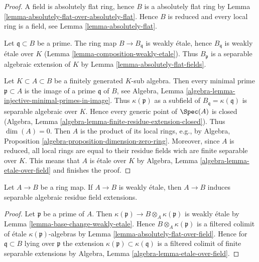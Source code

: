 \begin{proof}
A field is absolutely flat ring, hence $B$ is a absolutely
flat ring by Lemma \ref{lemma-absolutely-flat-over-absolutely-flat}.
Hence $B$ is reduced and every local
ring is a field, see Lemma \ref{lemma-absolutely-flat}.

\medskip\noindent
Let $\mathfrak q \subset B$ be a prime. The ring map
$B \to B_\mathfrak q$ is weakly \'etale, hence $B_\mathfrak q$
is weakly \'etale over $K$ (Lemma \ref{lemma-composition-weakly-etale}).
Thus $B_\mathfrak p$ is a separable algebraic extension of $K$ by
Lemma \ref{lemma-absolutely-flat-fields}.

\medskip\noindent
Let $K \subset A \subset B$ be a finitely generated $K$-sub algebra.
Then every minimal prime $\mathfrak p \subset A$ is the image of a prime
$\mathfrak q$ of $B$, see
Algebra, Lemma \ref{algebra-lemma-injective-minimal-primes-in-image}.
Thus $\kappa(\mathfrak p)$ as a subfield of
$B_\mathfrak q = \kappa(\mathfrak q)$ is separable algebraic over $K$.
Hence every generic point of $\Spec(A)$
is closed (Algebra, Lemma \ref{algebra-lemma-finite-residue-extension-closed}).
Thus $\dim(A) = 0$.
Then $A$ is the product of its local rings, e.g., by
Algebra, Proposition \ref{algebra-proposition-dimension-zero-ring}.
Moreover, since $A$ is reduced, all local rings are equal
to their residue fields wich are finite separable over $K$.
This means that $A$ is \'etale over $K$ by
Algebra, Lemma \ref{algebra-lemma-etale-over-field}
and finishes the proof.
\end{proof}

\begin{lemma}
\label{lemma-weakly-etale-residue-field-extensions}
Let $A \to B$ be a ring map. If $A \to B$ is weakly \'etale, then
$A \to B$ induces separable algebraic residue field extensions.
\end{lemma}

\begin{proof}
Let $\mathfrak p$ be a prime of $A$. Then
$\kappa(\mathfrak p) \to B \otimes_A \kappa(\mathfrak p)$ is weakly \'etale by
Lemma \ref{lemma-base-change-weakly-etale}.
Hence $B \otimes_A \kappa(\mathfrak p)$ is a filtered colimit of
\'etale $\kappa(\mathfrak p)$-algebras by
Lemma \ref{lemma-absolutely-flat-over-field}.
Hence for $\mathfrak q \subset B$ lying over $\mathfrak p$ the
extension $\kappa(\mathfrak p) \subset \kappa(\mathfrak q)$ is
a filtered colimit of finite separable extensions by
Algebra, Lemma \ref{algebra-lemma-etale-over-field}.
\end{proof}


